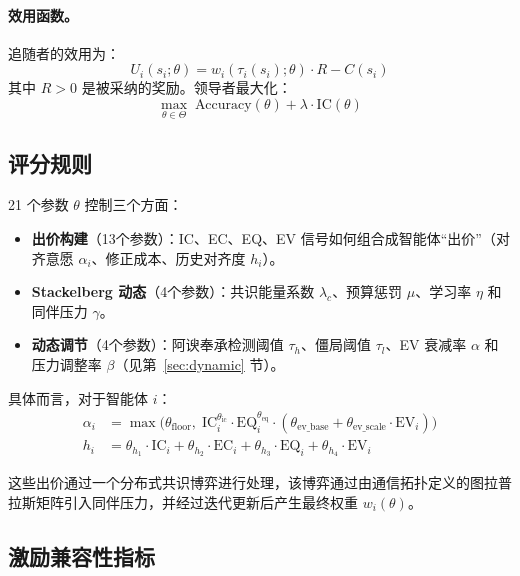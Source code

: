\paragraph{效用函数。} 追随者的效用为：
\begin{equation}
    U_i(s_i; \theta) = w_i(\tau_i(s_i); \theta) \cdot R - C(s_i)
    \label{eq:follower_utility}
\end{equation}
其中 $R > 0$ 是被采纳的奖励。领导者最大化：
\begin{equation}
    \max_{\theta \in \Theta} \; \text{Accuracy}(\theta) + \lambda \cdot \text{IC}(\theta)
    \label{eq:leader_obj}
\end{equation}

\subsection{评分规则}
\label{sec:scoring}

21 个参数 $\theta$ 控制三个方面：

\begin{itemize}
    \item \textbf{出价构建}（13个参数）：IC、EC、EQ、EV 信号如何组合成智能体“出价”（对齐意愿 $\alpha_i$、修正成本、历史对齐度 $h_i$）。
    \item \textbf{Stackelberg 动态}（4个参数）：共识能量系数 $\lambda_c$、预算惩罚 $\mu$、学习率 $\eta$ 和同伴压力 $\gamma$。
    \item \textbf{动态调节}（4个参数）：阿谀奉承检测阈值 $\tau_h$、僵局阈值 $\tau_l$、EV 衰减率 $\alpha$ 和压力调整率 $\beta$（见第~\ref{sec:dynamic} 节）。
\end{itemize}

具体而言，对于智能体 $i$：
\begin{align}
    \alpha_i &= \max\!\big(\theta_{\text{floor}}, \; \text{IC}_i^{\theta_{\text{ic}}} \cdot \text{EQ}_i^{\theta_{\text{eq}}} \cdot (\theta_{\text{ev\_base}} + \theta_{\text{ev\_scale}} \cdot \text{EV}_i)\big) \\
    h_i &= \theta_{h_1} \cdot \text{IC}_i + \theta_{h_2} \cdot \text{EC}_i + \theta_{h_3} \cdot \text{EQ}_i + \theta_{h_4} \cdot \text{EV}_i
\end{align}

这些出价通过一个分布式共识博弈进行处理，该博弈通过由通信拓扑定义的图拉普拉斯矩阵引入同伴压力，并经过迭代更新后产生最终权重 $w_i(\theta)$。

\subsection{激励兼容性指标}
\label{sec:ic_metric}

